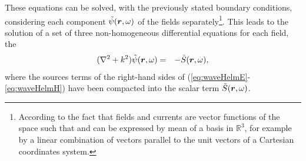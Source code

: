 These equations can be solved, with the previously stated boundary conditions, considering each component $\tilde{\psi}(\mbfit{r},\omega)$ of the fields separately\footnote{According to the fact that fields and currents are vector functions of the space such that and can be expressed by mean of a basis in $\mathbb{R}^3$, for example by a linear combination of vectors parallel to the unit vectors of a Cartesian coordinates system.}. This leads to the solution of a set of three non-homogeneous differential equations for each field, the 
\begin{eqnarray}
(\nabla^2 + k^2) \tilde{\psi}(\mbfit{r},\omega) &= & - \tilde{S} (\mbfit{r},\omega), \label{eq:scalHelm}
\end{eqnarray} where the sources terms of the right-hand sides of (\ref{eq:waveHelmE}-\ref{eq:waveHelmH}) have been compacted into the scalar term $\tilde{S} (\mbfit{r},\omega)$.

